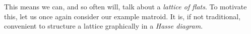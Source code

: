 \documentclass[12pt,oneside]{../../sfsuthesis}
\begin{document}


This means we can, and so often will, talk about a \emph{lattice of flats}.
To motivate this, let us once again consider our example matroid.
It is, if not traditional, convenient to structure a lattice graphically in a \emph{Hasse diagram}.
\end{document}
